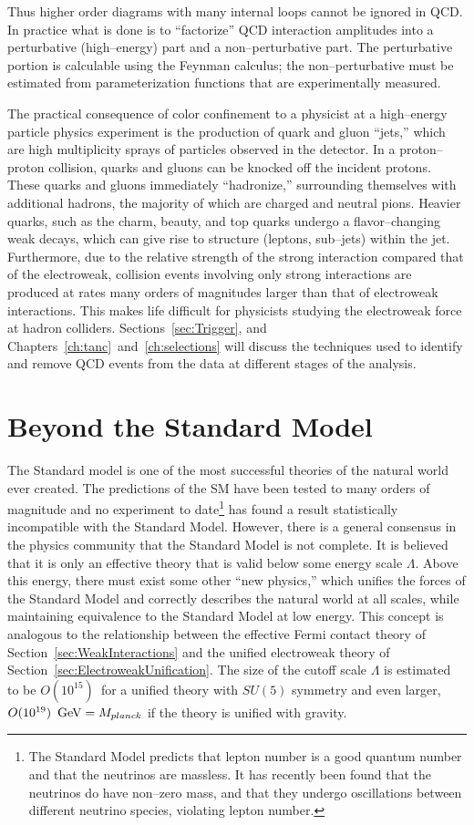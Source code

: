 Thus higher order diagrams with many internal loops cannot be ignored in
QCD\@.  In practice what is done is to ``factorize'' QCD interaction
amplitudes into a perturbative (high--energy) part and a non--perturbative
part.  The perturbative portion is calculable using the Feynman calculus; the
non--perturbative must be estimated from parameterization functions that are
experimentally measured.

The practical consequence of color confinement to a physicist at a high--energy
particle physics experiment is the production of quark and gluon ``jets,'' which
are high multiplicity sprays of particles observed in the detector.  In a
proton--proton collision, quarks and gluons can be knocked off the incident
protons.  These quarks and gluons immediately ``hadronize,'' surrounding
themselves with additional hadrons, the majority of which are charged and
neutral pions.  Heavier quarks, such as the charm, beauty, and top quarks
undergo a flavor--changing weak decays, which can give rise to structure
(leptons, sub--jets) within the jet.  Furthermore, due to the relative strength
of the strong interaction compared that of the electroweak, collision events
involving only strong interactions are produced at rates many orders of
magnitudes larger than that of electroweak interactions.  This makes life
difficult for physicists studying the electroweak force at hadron colliders.
Sections~\ref{sec:Trigger}, and Chapters~\ref{ch:tanc}~and~\ref{ch:selections}
will discuss the techniques used to identify and remove QCD events from the data
at different stages of the analysis.

\section{Beyond the Standard Model}
\label{sec:BSM} The Standard model is one of the most successful theories of the
natural world ever created.  The predictions of the SM have been tested to many
orders of magnitude and no experiment to date\footnote{The Standard Model
predicts that lepton number is a good quantum number and that the neutrinos are
massless.  It has recently been found that the neutrinos do have non--zero mass,
and that they undergo oscillations between different neutrino species, violating
lepton number.} has found a result statistically incompatible with the Standard
Model.  However, there is a general consensus in the physics community that the
Standard Model is not complete. It is believed that it is only an effective theory
that is valid below some energy scale $\Lambda$.  Above this energy, there must exist
some other ``new physics,'' which unifies the forces of the Standard Model and
correctly describes the natural world at all scales, while maintaining
equivalence to the Standard Model at low energy.  This concept is analogous to
the relationship between the effective Fermi contact theory of
Section~\ref{sec:WeakInteractions} and the unified electroweak theory of
Section~\ref{sec:ElectroweakUnification}. The size of the cutoff scale $\Lambda$
is estimated~\cite{Morii:SMandBSM} to be $O(10^{15})$~\GeV for a unified theory
with $SU(5)$ symmetry and even larger, $O(10^{19})~\,\text{Ge\hspace{-.08em}V} = M_{planck}$ if the
theory is unified with gravity.  

